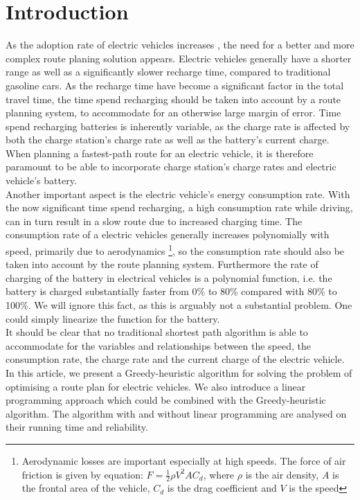 \section{Introduction}

As the adoption rate of electric vehicles increases \cite{ev-sales-increasing}, the need for a better and more complex route planing solution appears. Electric vehicles generally have a shorter range as well as a significantly slower recharge time, compared to traditional gasoline cars. As the recharge time have become a significant factor in the total travel time, the time spend recharging should be taken into account by a route planning system, to accommodate for an otherwise large margin of error. Time spend recharging batteries is inherently variable, as the charge rate is affected by both the charge station's charge rate as well as the battery's current charge. When planning a fastest-path route for an electric vehicle, it is therefore paramount to be able to incorporate charge station's charge rates and electric vehicle's battery.\\

Another important aspect is the electric vehicle's energy consumption rate. With the now significant time spend recharging, a high consumption rate while driving, can in turn result in a slow route due to increased charging time. The consumption rate of a electric vehicles generally increases polynomially with speed, primarily due to aerodynamics \footnote{Aerodynamic losses are important especially at high speeds. The force of air friction is given by equation: $F = \frac{1}{2} \rho V^2 A C_d$, where $\rho$ is the air density, $A$ is the frontal area of the vehicle, $C_d$ is the drag coefficient and $V$ is the speed}, so the consumption rate should also be taken into account by the route planning system. Furthermore the rate of charging of the battery in electrical vehicles is a polynomial function, i.e. the battery is charged substantially faster from 0\% to 80\% compared with 80\% to 100\%. We will ignore this fact, as this is arguably not a substantial problem. One could simply linearize the function for the battery.\\

It should be clear that no traditional shortest path algorithm is able to accommodate for the variables and relationships between the speed, the consumption rate, the charge rate and the current charge of the electric vehicle. In this article, we present a Greedy-heuristic algorithm for solving the problem of optimising a route plan for electric vehicles. We also introduce a linear programming approach which could be combined with the Greedy-heuristic algorithm. The algorithm with and without linear programming are analysed on their running time and reliability.




